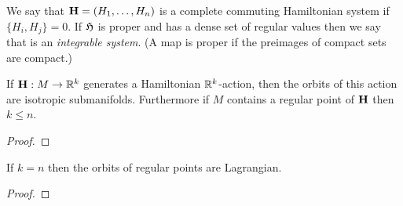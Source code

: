 \begin{dfn}
    We say that $\mathbf{H}=(H_1,\ldots,H_n)$ is a complete commuting Hamiltonian system if $\{H_i,H_j\}=0$.
    If $\mathfrak{H}$ is proper and has a dense set of regular values then we say that is an \emph{integrable system}.
    (A map is proper if the preimages of compact sets are compact.)
\end{dfn}

\begin{lem}
    If $\mathbf{H}:M\to\mathbb{R}^k$ generates a Hamiltonian $\mathbb{R}^k$-action, then the orbits of this action are isotropic submanifolds.
    Furthermore if $M$ contains a regular point of $\mathbf{H}$ then $k\le n$.
\end{lem}

\begin{proof}
\end{proof}

\begin{cor}
    If $k=n$ then the orbits of regular points are Lagrangian.
\end{cor}

\begin{proof}
\end{proof}